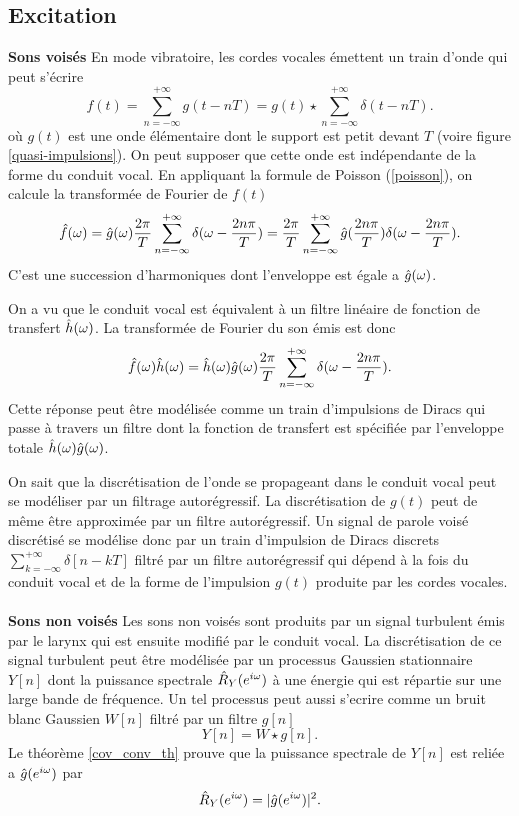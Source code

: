 \subsection {Excitation}

{\bf Sons vois\'es}
En mode vibratoire, les cordes vocales \'emettent un train
d'onde qui peut s'\'ecrire
\[
f(t) = \sum_{n=-\infty}^{+\infty} g(t - n T) =
g(t) \star \sum_{n=-\infty}^{+\infty} \delta (t - n T) .
\]
o\`u $g(t)$ est une onde \'el\'ementaire dont le support est
petit devant $T$ (voire figure \ref{quasi-impulsions}).
On peut supposer que cette
onde est ind\'ependante de la forme du conduit vocal.
En appliquant la formule de Poisson (\ref{poisson}), on calcule
la transform\'ee de Fourier de $f(t)$
\[
\hat f ({\omega}) = \hat g({\omega})
\frac {2 \pi} T \sum_{n=-\infty}^{+\infty}
\delta ({\omega} - \frac {2 n \pi} T ) =
\frac {2 \pi} T \sum_{n=-\infty}^{+\infty}
\hat g(\frac {2 n \pi} T ) \delta ({\omega} - \frac {2 n \pi} T ) .
\]
C'est une succession d'harmoniques dont l'enveloppe est \'egale
a $\hat g ({\omega})$.

On a vu que le conduit vocal est \'equivalent \`a un filtre lin\'eaire
de fonction de transfert $\hat h ({\omega})$. La transform\'ee
de Fourier du son \'emis est donc
\[
\hat f({\omega}) \hat h ({\omega} ) =
\hat h ({\omega} ) \hat g({\omega})
\frac {2 \pi} T \sum_{n=-\infty}^{+\infty}\delta ({\omega} - \frac {2 n \pi} T ) .
\]
Cette r\'eponse peut \^etre mod\'elis\'ee comme un train d'impulsions
de Diracs qui passe \`a travers un filtre dont la fonction
de transfert est sp\'ecifi\'ee par l'enveloppe totale
$\hat h ({\omega}) \hat g ({\omega})$.

On sait que la discr\'etisation de l'onde se propageant dans le
conduit vocal peut se mod\'eliser par un filtrage autor\'egressif.
La discr\'etisation de $g(t)$
peut de m\^eme \^etre approxim\'ee par un filtre autor\'egressif.
Un signal de parole vois\'e discr\'etis\'e se mod\'elise donc par
un train d'impulsion de Diracs discrets
$\sum_{k=-\infty}^{+\infty} \delta [n-kT]$ filtr\'e par
un filtre autor\'egressif qui d\'epend \`a la fois du conduit
vocal et de la forme de l'impulsion $g(t)$ produite par
les cordes vocales.
\\
\\
{\bf Sons non vois\'es}
Les sons non vois\'es sont produits par un signal turbulent
\'emis par le larynx qui est ensuite modifi\'e par le conduit vocal.
La discr\'etisation de ce signal turbulent
peut \^etre mod\'elis\'ee par un processus Gaussien
stationnaire $Y[n]$ dont la puissance spectrale
$\hat R_{Y} ({e ^{i \omega}})$
\`a une \'energie qui est r\'epartie sur
une large bande de fr\'equence. Un tel processus peut
aussi s'ecrire comme
un bruit blanc Gaussien $W[n]$ filtr\'e par un filtre $g[n]$
\[
Y[n] = W \star g [n].
\]
Le th\'eor\`eme \ref{cov_conv_th}  prouve que la puissance spectrale
de $Y[n]$ est reli\'ee a $\hat g ({e ^{i \omega}})$ par
\[
\hat R_{Y} ({e ^{i \omega}}) = |\hat g ({e ^{i \omega}})|^2 .
\]

